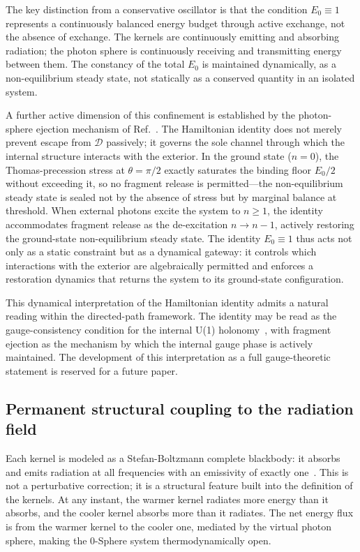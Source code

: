 \documentclass[%
 reprint, amsmath,amssymb, aps, prb, ]{revtex4-2}
\numberwithin{equation}{section}
\begin{document}
The key distinction from a conservative oscillator is that the condition $E_0 \equiv 1$ represents a continuously balanced energy budget through active exchange, not the absence of exchange. The kernels are continuously emitting and absorbing radiation; the photon sphere is continuously receiving and transmitting energy between them. The constancy of the total $E_0$ is maintained dynamically, as a non-equilibrium steady state, not statically as a conserved quantity in an isolated system.

A further active dimension of this confinement is established by the photon-sphere ejection mechanism of Ref.~\cite{hanamura49}. The Hamiltonian identity does not merely prevent escape from $\mathcal{D}$ passively; it governs the sole channel through which the internal structure interacts with the exterior. In the ground state ($n = 0$), the Thomas-precession stress at $\theta = \pi/2$ exactly saturates the binding floor $E_0/2$ without exceeding it, so no fragment release is permitted---the non-equilibrium steady state is sealed not by the absence of stress but by marginal balance at threshold. When external photons excite the system to $n \geq 1$, the identity accommodates fragment release as the de-excitation $n \to n - 1$, actively restoring the ground-state non-equilibrium steady state. The identity $E_0 \equiv 1$ thus acts not only as a static constraint but as a dynamical gateway: it controls which interactions with the exterior are algebraically permitted and enforces a restoration dynamics that returns the system to its ground-state configuration.

This dynamical interpretation of the Hamiltonian identity admits a natural reading within the directed-path framework. The identity may be read as the gauge-consistency condition for the internal U(1) holonomy~\cite{hanamura48}, with fragment ejection as the mechanism by which the internal gauge phase is actively maintained. The development of this interpretation as a full gauge-theoretic statement is reserved for a future paper.

\subsection{Permanent structural coupling to the radiation field}
\label{sec:coupling}

Each kernel is modeled as a Stefan-Boltzmann complete blackbody: it absorbs and emits radiation at all frequencies with an emissivity of exactly one~\cite{hanamura01}. This is not a perturbative correction; it is a structural feature built into the definition of the kernels. At any instant, the warmer kernel radiates more energy than it absorbs, and the cooler kernel absorbs more than it radiates. The net energy flux is from the warmer kernel to the cooler one, mediated by the virtual photon sphere, making the 0-Sphere system thermodynamically open.
\end{document}
